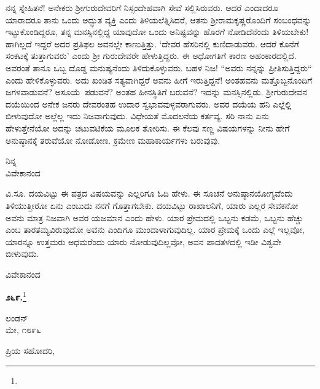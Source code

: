 ನನ್ನ ಸ್ನೇಹಿತನೆ! ಅನೇಕರು ಶ‍್ರೀಗುರುದೇವರಿಗೆ ನಿಸ್ಸಂದೇಹವಾಗಿ ಸೇವೆ ಸಲ್ಲಿಸಿರುವರು. ಆದರೆ ಎಂದಾದರೂ ಯಾರಾದರೂ ತಾನು ಒಂದು ಅದ್ಭುತ ವ್ಯಕ್ತಿ ಎಂದು ತಿಳಿಯಲೆತ್ನಿಸಿದರೆ, ಆತನು ಶ‍್ರೀರಾಮಕೃಷ್ಣರೊಂದಿಗೆ ಸಂಬಂಧವನ್ನು ಇಟ್ಟುಕೊಂಡಿದ್ದರೂ, ತನ್ನ ಮನಸ್ಸಿನಲ್ಲಿದ್ದ ಯಾವುದೋ ಒಂದು ಅನಿಷ್ಟವನ್ನು ಹೊರಗೆ ನೋಡಿದೆನೆಂದು ತಿಳಿಯಬೇಕು! ಹಾಗಿಲ್ಲದೆ ಇದ್ದರೆ ಅದರ ಪ್ರತಿಫಲ ಅವನಲ್ಲೇ ಕಾಣುತ್ತಿತ್ತು. ‘ದೇವರ ಹೆಸರಿನಲ್ಲಿ ಕುಣಿದಾಡುವರು. ಆದರೆ ಕೊನೆಗೆ ಸಂಕಟಕ್ಕೆ ತುತ್ತಾಗುವರು’ ಎಂದು ಶ‍್ರೀ ಗುರುದೇವರೇ ಹೇಳುತ್ತಿದ್ದರು. ಈ ಅಧೋಗತಿಗೆ ಕಾರಣ ಅಹಂಕಾರದಲ್ಲಿದೆ. ಅವರಂತೆ ತಾನೂ ಒಬ್ಬ ದೊಡ್ಡ ಮನುಷ್ಯನೆಂದು ತಿಳಿದುಕೊಳ್ಳುವರು. ಬಹಳ ನಿಜ! “ಅವರು ನನ್ನನ್ನು ಪ್ರೀತಿಸುತ್ತಿದ್ದರು“ ಎಂದು ಹೇಳಿಕೊಳ್ಳುವರು. ಅದು ಖಂಡಿತ ಸತ್ಯವಾಗಿದ್ದರೆ ಅವನು ಹೀಗೆ ಇರುತ್ತಿದ್ದನೆ! ಅಂತಹವನು ಮತ್ತೊಬ್ಬನೊಂದಿಗೆ ಜಗಳವಾಡುವನೆ? \hbox{ಅಸೂಯೆ ಪಡುವನೆ?} ಅಂತಹ ಹೀನಸ್ಥಿತಿಗೆ ಬರುವನೆ? ಇದನ್ನು ಮನಸ್ಸಿನಲ್ಲಿಡು. ಶ‍್ರೀಗುರುದೇವನ ದಯೆಯಿಂದ ಅನೇಕ ಜನರು ದೇವರಂತಹ ಉದಾರ ಸ್ವಭಾವವುಳ್ಳವರಾಗುವರು. ಅವರ ದಯೆಯ ಹನಿ ಎಲ್ಲೆಲ್ಲಿ ಬೀಳುವುದೋ ಅಲ್ಲೆಲ್ಲ ಇದು ನಿಜವಾಗುವುದು. ವಿಧೇಯತೆ ಮೊದಲನೆಯ ಕರ್ತವ್ಯ. ಸರಿ ನಾನು ಏನು ಹೇಳುತ್ತೇನೆಯೋ ಅದನ್ನು ಚಟುವಟಿಕೆಯ ಮೂಲಕ ತೋರಿಸು. ಈ ಕೆಲವು ಸಣ್ಣ ವಿಷಯಗಳನ್ನು ನೀನು ಹೇಗೆ ಅನುಷ್ಠಾನಕ್ಕೆ ತರುವೆಯೋ ನೋಡೋಣ. ಕ್ರಮೇಣ ಮಹಾಕಾರ್ಯಗಳು ಬರುವುವು.

{\flushright
ನಿನ್ನ\\ವಿವೇಕಾನಂದ\par}

\vspace{0.2cm}

ವಿ.ಸೂ.\enginline{-} ದಯವಿಟ್ಟು ಈ ಪತ್ರದ ವಿಷಯವನ್ನು ಎಲ್ಲರಿಗೂ ಓದಿ ಹೇಳು. ಈ ಸೂಚನೆ ಅನುಷ್ಠಾನಯೋಗ್ಯವೆಂದು ತಿಳಿಯುತ್ತೀರೋ ಏನು ಎಂಬುದು ನನಗೆ ಗೊತ್ತಾಗಬೇಕು. ದಯವಿಟ್ಟು ರಾಖಾಲನಿಗೆ, ಯಾರು ಎಲ್ಲರ ಸೇವಕನೋ ಅವನು ಮಾತ್ರ ನಿಜವಾಗಿ ಅವರ ಯಜಮಾನ ಎಂದು ಹೇಳು. ಯಾರ ಪ್ರೇಮದಲ್ಲಿ ಒಬ್ಬನು ಕಡಮೆ, ಒಬ್ಬನು ಹೆಚ್ಚು ಎಂಬ ತಾರತಮ್ಯವಿರುವುದೋ ಅವನು ಎಂದಿಗೂ ಮುಂದಾಳಾಗುವುದಿಲ್ಲ. ಯಾರ ಪ್ರೇಮಕ್ಕೆ ಒಂದು ಎಲ್ಲೆ ಇಲ್ಲವೋ, ಯಾರನ್ನೂ ಉತ್ತಮರು ಅಧಮರೆಂದು ಯಾರು ನೋಡುವುದಿಲ್ಲವೋ, ಅವನ ಪಾದತಳದಲ್ಲಿ ಇಡೀ ವಿಶ್ವವೇ ಬೀಳುವುದು.

{\flushright
ವಿವೇಕಾನಂದ\par}
\vspace{0.2cm}

\begin{center}
\textbf{೨೬೯.}\footnote{}
\end{center}

\begin{flushright}
ಲಂಡನ್\\ಮೇ, ೧೮೯೬
\end{flushright}
\vspace{0.2cm}

\noindent
ಪ್ರಿಯ ಸಹೋದರಿ,

\vspace{0.2cm}

